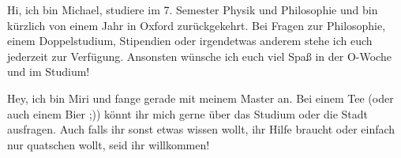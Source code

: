\begin{multicols*}{2}
{Hi, ich bin Michael, studiere im 7. Semester Physik und Philosophie und bin kürzlich von einem Jahr in Oxford zurückgekehrt. Bei Fragen zur Philosophie, einem Doppelstudium, Stipendien oder irgendetwas anderem stehe ich euch jederzeit zur Verfügung. Ansonsten wünsche ich euch viel Spaß in der O-Woche und im Studium!}

{Hey, ich bin Miri und fange gerade mit meinem Master an. Bei einem Tee (oder auch einem Bier ;)) könnt ihr mich gerne über das Studium oder die Stadt ausfragen. Auch falls ihr sonst etwas wissen wollt, ihr Hilfe braucht oder einfach nur quatschen wollt, seid ihr willkommen!
\vspace{1ex}}


\end{multicols*}

